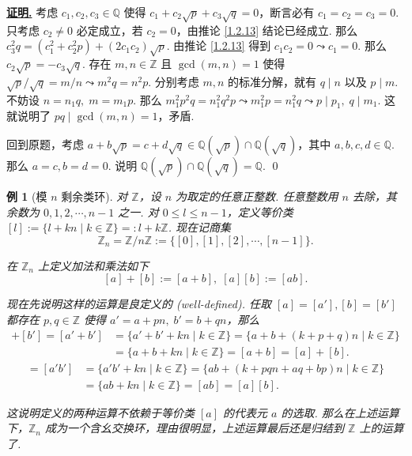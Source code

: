 \documentclass[10pt,openany]{article}
\theoremstyle{thmstyle} %
\theoremstyle{defstyle} %
\theoremstyle{prostyle} %
\theoremstyle{exastyle}
\newtheorem{example}[theorem]{例}
\theoremstyle{remstyle}
\renewenvironment{proof}[1][证明]{\par\underline{\textbf{#1.}} \;\fangsong}{\qed\par}
\begin{document}
\begin{proof}
	考虑 \( c_1,c_2,c_3 \in \mathbb{Q} \) 使得 \( c_1+c_2\sqrt{p}+c_3\sqrt{q}=0 \)，断言必有 \( c_1=c_2=c_3=0 \). 只考虑 \( c_2 \neq 0 \) 必定成立，若 \( c_2=0 \)，由推论 \ref{1.2.13} 结论已经成立. 那么 \( c_3^2q=(c_1^2+c_2^2p)+(2c_1c_2)\sqrt{p} \). 由推论 \ref{1.2.13} 得到 \( c_1c_2=0 \leadsto c_1=0 \). 那么 \( c_2\sqrt{p}=-c_3\sqrt{q} \). 存在 \( m,n \in \mathbb{Z} \) 且 \( \gcd(m,n)=1 \) 使得 \( \sqrt{p}/\sqrt{q}=m/n \leadsto m^2q=n^2p \). 分别考虑 \( m,n \) 的标准分解，就有 \( q \mid n \) 以及 \( p \mid m \). 不妨设 \( n=n_1q, \; m=m_1p \). 那么 \( m_1^2p^2q=n_1^2q^2p \leadsto m_1^2p=n_1^2q \leadsto p \mid p_1, \; q \mid m_1 \). 这就说明了 \( pq \mid \gcd(m,n)=1 \)，矛盾. 
	
	回到原题，考虑 \( a+b\sqrt{p}=c+d\sqrt{q} \in \mathbb{Q}(\sqrt{p}) \cap \mathbb{Q}(\sqrt{q}) \)，其中 \( a,b,c,d \in \mathbb{Q} \). 那么 \( a=c, b=d=0 \). 说明 \( \mathbb{Q}(\sqrt{p}) \cap \mathbb{Q}(\sqrt{q})=\mathbb{Q} \). 
\end{proof}

\begin{example}[模 \( n \) 剩余类环]
	对 \( \mathbb{Z} \)，设 \( n \) 为取定的任意正整数. 任意整数用 \( n \) 去除，其余数为 \( 0,1,2,\cdots,n-1 \) 之一. 对 \( 0 \leq l \leq n-1 \)，定义等价类 \( [l]:=\{l+kn\mid k \in \mathbb{Z}\}=:l+k\mathbb{Z} \). 现在记商集
	\[ \mathbb{Z}_n=\mathbb{Z}/n\mathbb{Z}:=\{ [0],[1],[2],\cdots,[n-1]\}. \]
	
	在 \( \mathbb{Z}_n \) 上定义加法和乘法如下
	\[ [a]+[b]:=[a+b], \; [a][b]:=[ab]. \]
	
	现在先说明这样的运算是良定义的 (well-defined). 任取 \( [a]=[a'], [b]=[b']  \) 都存在 \( p,q \in \mathbb{Z} \) 使得 \( a'=a+pn, \; b'=b+qn \)，那么
	\begin{align*}
	[a']+[b']=[a'+b'] &=\{a'+b'+kn \mid k \in \mathbb{Z} \}=\{a+b+(k+p+q)n \mid k \in \mathbb{Z} \} \\
	&=\{a+b+kn \mid k \in \mathbb{Z} \}=[a+b]=[a]+[b].
	\end{align*}
	\begin{align*}
		[a'][b']=[a'b'] &=\{a'b'+kn \mid k \in \mathbb{Z} \}=\{ab+(k+pqn+aq+bp)n \mid k \in \mathbb{Z} \} \\
		&=\{ab+kn \mid k \in \mathbb{Z} \}=[ab]=[a][b].
	\end{align*}

	
	这说明定义的两种运算不依赖于等价类 \( [a] \) 的代表元 \( a \) 的选取. 那么在上述运算下，\( \mathbb{Z}_n \) 成为一个含幺交换环，理由很明显，上述运算最后还是归结到 \( \mathbb{Z} \) 上的运算了.
\end{example}
\end{document}
